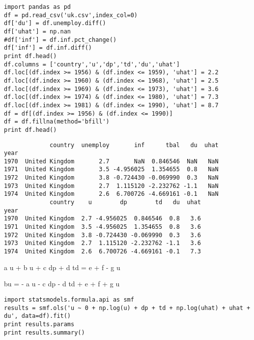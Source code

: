 \documentclass[12pt,fleqn]{article}\usepackage{../../common}
\begin{document}
\begin{verbatim}
import pandas as pd
df = pd.read_csv('uk.csv',index_col=0)
df['du'] = df.unemploy.diff()
df['uhat'] = np.nan
#df['inf'] = df.inf.pct_change()
df['inf'] = df.inf.diff()
print df.head()
df.columns = ['country','u','dp','td','du','uhat']
df.loc[(df.index >= 1956) & (df.index <= 1959), 'uhat'] = 2.2
df.loc[(df.index >= 1960) & (df.index <= 1968), 'uhat'] = 2.5
df.loc[(df.index >= 1969) & (df.index <= 1973), 'uhat'] = 3.6
df.loc[(df.index >= 1974) & (df.index <= 1980), 'uhat'] = 7.3
df.loc[(df.index >= 1981) & (df.index <= 1990), 'uhat'] = 8.7
df = df[(df.index >= 1956) & (df.index <= 1990)]
df = df.fillna(method='bfill')
print df.head()
\end{verbatim}

\begin{verbatim}
             country  unemploy       inf      tbal   du  uhat
year                                                         
1970  United Kingdom       2.7       NaN  0.846546  NaN   NaN
1971  United Kingdom       3.5 -4.956025  1.354655  0.8   NaN
1972  United Kingdom       3.8 -0.724430 -0.069990  0.3   NaN
1973  United Kingdom       2.7  1.115120 -2.232762 -1.1   NaN
1974  United Kingdom       2.6  6.700726 -4.669161 -0.1   NaN
             country    u        dp        td   du  uhat
year                                                    
1970  United Kingdom  2.7 -4.956025  0.846546  0.8   3.6
1971  United Kingdom  3.5 -4.956025  1.354655  0.8   3.6
1972  United Kingdom  3.8 -0.724430 -0.069990  0.3   3.6
1973  United Kingdom  2.7  1.115120 -2.232762 -1.1   3.6
1974  United Kingdom  2.6  6.700726 -4.669161 -0.1   7.3
\end{verbatim}

a \log u + b u +  c dp + d td = e \log {} + f  - g \Delta u

bu = - a \log u  -  c dp - d td + e \log {} + f  + g \Delta u

\begin{verbatim}
import statsmodels.formula.api as smf
results = smf.ols('u ~ 0 + np.log(u) + dp + td + np.log(uhat) + uhat + du', data=df).fit()
print results.params
print results.summary()
\end{verbatim}
\end{document}
